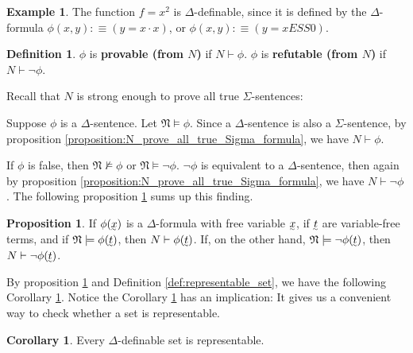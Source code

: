 \documentclass[11pt,letterpaper]{book}
\newcommand{\ut}[1]{\underaccent{\sim}{#1}}
\renewcommand{\vec}[1]{\ut{#1}}
\theoremstyle{definition}
\newtheorem{definition}{Definition}[section]
\newtheorem{proposition}{Proposition}[section]
\newtheorem{corollary}{Corollary}[section]
\newtheorem{example}{Example}[section]
\begin{document}
\begin{example}
The function $f = x^2$ is $\Delta$-definable, since it is defined by the $\Delta$-formula $\phi(x, y) :\equiv (y = x \cdot x) $, or $\phi(x, y) :\equiv (y = x E S S 0) $.
\end{example}


\begin{definition}
$\phi$ is \textbf{provable (from $N$)} if $N \vdash \phi$. $\phi$ is
\textbf{refutable (from $N$)} if $N \vdash \lnot \phi$.
\end{definition}

Recall that $N$ is strong enough to prove all true $\Sigma$-sentences:

\propNproveSigma*

Suppose $\phi$ is a $\Delta$-sentence. Let $\mathfrak{N} \models \phi$. Since
a $\Delta$-sentence is also a $\Sigma$-sentence, by proposition
\ref{proposition:N_prove_all_true_Sigma_formula}, we have $N \vdash \phi$.

If $\phi$ is false, then $\mathfrak{N} \not \models \phi$ or
$\mathfrak{N} \models \lnot \phi$. $\lnot \phi$ is equivalent to a
$\Delta$-sentence, then again by proposition
\ref{proposition:N_prove_all_true_Sigma_formula}, we have $N \vdash
\lnot \phi$. The following proposition
\ref{proposition:N_prove_Delta_formula} sums up this finding.





\begin{proposition}\label{proposition:N_prove_Delta_formula}
If $\phi(\vec x)$ is a $\Delta$-formula with free variable $\vec x $, if
$\vec t $ are variable-free terms, and if $\mathfrak{N} \models
\phi(\vec t )$, then $N \vdash \phi(\vec t)$. If, on the other hand,
$\mathfrak{N} \models \lnot \phi(\vec t )$, then $N \vdash \lnot
\phi(\vec t)$.
\end{proposition}


By proposition \ref{proposition:N_prove_Delta_formula} and Definition
\ref{def:representable_set}, we have the following Corollary
\ref{corollary:representable_set}.  Notice the Corollary \ref{corollary:representable_set} has an implication: It
gives us a convenient way to check whether a set is representable.


\begin{corollary}\label{corollary:representable_set}
Every $\Delta$-definable set is representable.
\end{corollary}
\end{document}
